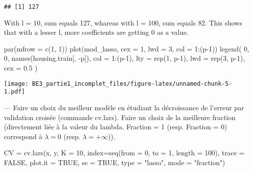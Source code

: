 \documentclass[
]{article}
\newenvironment{Shaded}{\begin{snugshade}}{\end{snugshade}}
\newcommand{\AttributeTok}[1]{\textcolor[rgb]{0.77,0.63,0.00}{#1}}
\newcommand{\ConstantTok}[1]{\textcolor[rgb]{0.00,0.00,0.00}{#1}}
\newcommand{\DecValTok}[1]{\textcolor[rgb]{0.00,0.00,0.81}{#1}}
\newcommand{\FloatTok}[1]{\textcolor[rgb]{0.00,0.00,0.81}{#1}}
\newcommand{\FunctionTok}[1]{\textcolor[rgb]{0.00,0.00,0.00}{#1}}
\newcommand{\NormalTok}[1]{#1}
\newcommand{\OtherTok}[1]{\textcolor[rgb]{0.56,0.35,0.01}{#1}}
\newcommand{\SpecialCharTok}[1]{\textcolor[rgb]{0.00,0.00,0.00}{#1}}
\newcommand{\StringTok}[1]{\textcolor[rgb]{0.31,0.60,0.02}{#1}}
\begin{document}
\begin{verbatim}
## [1] 127
\end{verbatim}

With l = 10, sum equals 127, whareas with l = 100, sum equals 82. This
shows that with a lesser l, more coefficients are getting 0 as a value.

\begin{Shaded}
\begin{Highlighting}[]
\FunctionTok{par}\NormalTok{(}\AttributeTok{mfrow =} \FunctionTok{c}\NormalTok{(}\DecValTok{1}\NormalTok{, }\DecValTok{1}\NormalTok{))}
\FunctionTok{plot}\NormalTok{(mod\_lasso, }\AttributeTok{cex =} \DecValTok{1}\NormalTok{, }\AttributeTok{lwd =} \DecValTok{3}\NormalTok{, }\AttributeTok{col =} \DecValTok{1}\SpecialCharTok{:}\NormalTok{(p}\DecValTok{{-}1}\NormalTok{))}
\FunctionTok{legend}\NormalTok{(}
  \DecValTok{0}\NormalTok{,}
  \DecValTok{0}\NormalTok{,}
  \FunctionTok{names}\NormalTok{(housing.train[, }\SpecialCharTok{{-}}\NormalTok{p]),}
  \AttributeTok{col =} \DecValTok{1}\SpecialCharTok{:}\NormalTok{(p}\DecValTok{{-}1}\NormalTok{),}
  \AttributeTok{lty =} \FunctionTok{rep}\NormalTok{(}\DecValTok{1}\NormalTok{, p}\DecValTok{{-}1}\NormalTok{),}
  \AttributeTok{lwd =} \FunctionTok{rep}\NormalTok{(}\DecValTok{3}\NormalTok{, p}\DecValTok{{-}1}\NormalTok{),}
  \AttributeTok{cex =} \FloatTok{0.5}
\NormalTok{)}
\end{Highlighting}
\end{Shaded}

\texttt{[image: BE3\_partie1\_incomplet\_files/figure-latex/unnamed-chunk-5-1.pdf]}

--- Faire un choix du meilleur modèle en étudiant la décroissance de
l'erreur par validation croisée (commande cv.lars). Faire un choix de la
meilleure fraction (directement liée à la valeur du lambda. Fraction = 1
(resp. Fraction = 0) correspond à \(\lambda = 0\) (resp.
\(\lambda = +\infty\))).

\begin{Shaded}
\begin{Highlighting}[]
\NormalTok{CV }\OtherTok{=} \FunctionTok{cv.lars}\NormalTok{(x, y, }\AttributeTok{K =} \DecValTok{10}\NormalTok{, }\AttributeTok{index=}\FunctionTok{seq}\NormalTok{(}\AttributeTok{from =} \DecValTok{0}\NormalTok{, }\AttributeTok{to =} \DecValTok{1}\NormalTok{, }\AttributeTok{length =} \DecValTok{100}\NormalTok{),}
             \AttributeTok{trace =} \ConstantTok{FALSE}\NormalTok{, }\AttributeTok{plot.it =} \ConstantTok{TRUE}\NormalTok{, }\AttributeTok{se =} \ConstantTok{TRUE}\NormalTok{, }\AttributeTok{type =} \StringTok{"lasso"}\NormalTok{, }\AttributeTok{mode =} \StringTok{"fraction"}\NormalTok{)}
\end{Highlighting}
\end{Shaded}
\end{document}
